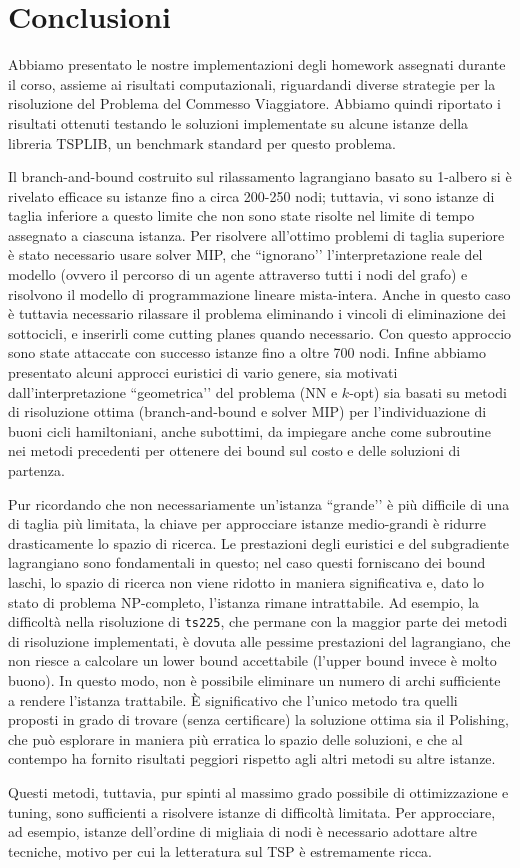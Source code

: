 \chapter{Conclusioni}
Abbiamo presentato le nostre implementazioni degli homework assegnati durante il corso, assieme ai risultati computazionali, riguardandi diverse strategie per la risoluzione del Problema del Commesso Viaggiatore. Abbiamo quindi riportato i risultati ottenuti testando le soluzioni implementate su alcune istanze della libreria TSPLIB, un benchmark standard per questo problema.

Il branch-and-bound costruito sul rilassamento lagrangiano basato su 1-albero si è rivelato efficace su istanze fino a circa 200-250 nodi; tuttavia, vi sono istanze di taglia inferiore a questo limite che non sono state risolte nel limite di tempo assegnato a ciascuna istanza. Per risolvere all’ottimo problemi di taglia superiore è stato necessario usare solver MIP, che ``ignorano’’ l’interpretazione reale del modello (ovvero il percorso di un agente attraverso tutti i nodi del grafo) e risolvono il modello di programmazione lineare mista-intera. Anche in questo caso è tuttavia necessario rilassare il problema eliminando i vincoli di eliminazione dei sottocicli, e inserirli come cutting planes quando necessario. Con questo approccio sono state attaccate con successo istanze fino a oltre 700 nodi. Infine abbiamo presentato alcuni approcci euristici di vario genere, sia motivati dall’interpretazione ``geometrica’’ del problema (NN e $k$-opt) sia basati su metodi di risoluzione ottima (branch-and-bound e solver MIP) per l’individuazione di buoni cicli hamiltoniani, anche subottimi, da impiegare anche come subroutine nei metodi precedenti per ottenere dei bound sul costo e delle soluzioni di partenza.

Pur ricordando che non necessariamente un’istanza ``grande’’ è più difficile di una di taglia più limitata, la chiave per approcciare istanze medio-grandi è ridurre drasticamente lo spazio di ricerca. Le prestazioni degli euristici e del subgradiente lagrangiano sono fondamentali in questo; nel caso questi forniscano dei bound laschi, lo spazio di ricerca non viene ridotto in maniera significativa e, dato lo stato di problema NP-completo, l’istanza rimane intrattabile. Ad esempio, la difficoltà nella risoluzione di \texttt{ts225}, che permane con la maggior parte dei metodi di risoluzione implementati, è dovuta alle pessime prestazioni del lagrangiano, che non riesce a calcolare un lower bound accettabile (l’upper bound invece è molto buono). In questo modo, non è possibile eliminare un numero di archi sufficiente a rendere l’istanza trattabile. È significativo che l’unico metodo tra quelli proposti in grado di trovare (senza certificare) la soluzione ottima sia il Polishing, che può esplorare in maniera più erratica lo spazio delle soluzioni, e che al contempo ha fornito risultati peggiori rispetto agli altri metodi su altre istanze.

Questi metodi, tuttavia, pur spinti al massimo grado possibile di ottimizzazione e tuning, sono sufficienti a risolvere istanze di difficoltà limitata. Per approcciare, ad esempio, istanze dell’ordine di migliaia di nodi è necessario adottare altre tecniche, motivo per cui la letteratura sul TSP è estremamente ricca. 
